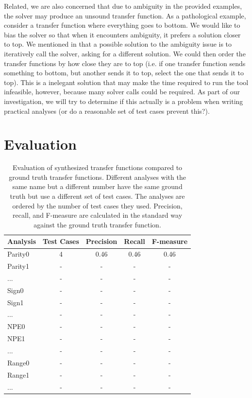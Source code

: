 \documentclass[10pt,conference]{IEEEtran}
\begin{document}
Related, we are also concerned that due to ambiguity in the provided
examples, the solver may produce an unsound transfer function.
As a pathological example, consider a transfer function where
everything goes to bottom. We would like to bias the solver
so that when it encounters ambiguity, it prefers a solution
closer to top. We mentioned in  that a possible solution
to the ambiguity issue is to iteratively call the solver, asking for
a different solution. We could then order the transfer functions
by how close they are to top (i.e. if one transfer function sends something
to bottom, but another sends it to top, select the one that sends it to top).
This is a inelegant solution that may make the
time required to run the tool infeasible, however, because
many solver calls could be required.
As part of our investigation, we will try to
determine if this actually is a problem when writing practical
analyses (or do a reasonable set of test cases prevent this?).

\section{Evaluation}
\label{sec-eval}

\begin{table}
\centering
 \begin{tabular}{l c c c c }
  
  Analysis & Test Cases & Precision & Recall & F-measure\\ 
  \midrule
  Parity0 & 4 & 0.46 & 0.46 & 0.46 \\
  Parity1 & - & - & - & - \\
  ... & - & - & - & - \\
  Sign0 & - & - & - & - \\
  Sign1 & - & - & - & - \\
  ... & - & - & - & - \\
  NPE0 & - & - & - & - \\
  NPE1 & - & - & - & - \\
  ... & - & - & - & - \\
  Range0 & - & - & - & - \\
  Range1 & - & - & - & - \\
  ... & - & - & - & - \\
 \end{tabular}
 \caption{Evaluation of synthesized transfer functions compared
 to ground truth transfer functions. Different analyses with
 the same name but a different number have the same ground truth
 but use a different set of test cases. The analyses are ordered
 by the number of test cases they used. Precision, recall, and
 F-measure are calculated in the standard way against the ground
 truth transfer function.}
 \label{tab-analyses}
\end{table} 
\end{document}
